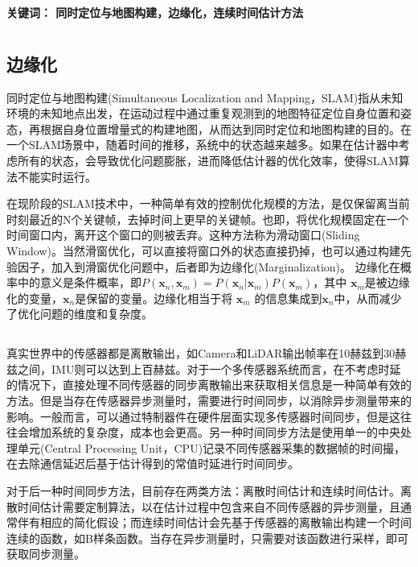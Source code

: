 \documentclass[12pt, onecolumn]{article}
\newcommand\normf{\fangsong}
\newcommand\keywords[1]{\bfseries{关键词：} \normf #1}
\begin{document}
	\noindent\keywords{同时定位与地图构建，边缘化，连续时间估计方法}
	
	\section{\normf{概述}}
	\normf\bfseries
	
	\subsection{\normf 边缘化}
	同时定位与地图构建(Simultaneous Localization and Mapping，SLAM)指从未知环境的未知地点出发，在运动过程中通过重复观测到的地图特征定位自身位置和姿态，再根据自身位置增量式的构建地图，从而达到同时定位和地图构建的目的\cite{高翔2017视觉}。在一个SLAM场景中，随着时间的推移，系统中的状态越来越多。如果在估计器中考虑所有的状态，会导致优化问题膨胀，进而降低估计器的优化效率，使得SLAM算法不能实时运行。
	
	在现阶段的SLAM技术中，一种简单有效的控制优化规模的方法，是仅保留离当前时刻最近的N个关键帧，去掉时间上更早的关键帧。也即，将优化规模固定在一个时间窗口内，离开这个窗口的则被丢弃。这种方法称为滑动窗口(Sliding Window)\cite{sibley2008sliding}。当然滑窗优化，可以直接将窗口外的状态直接扔掉，也可以通过构建先验因子，加入到滑窗优化问题中，后者即为边缘化(Marginalization)。
	边缘化在概率中的意义是条件概率，即$ P (\boldsymbol{x}_n, \boldsymbol{x}_m) = P (\boldsymbol{x}_n |\boldsymbol{x}_m)P (\boldsymbol{x}_m)$，其中 $\boldsymbol{x}_m$是被边缘化的变量，$\boldsymbol{x}_n$是保留的变量。边缘化相当于将 $\boldsymbol{x}_m$ 的信息集成到$\boldsymbol{x}_n$中，从而减少了优化问题的维度和复杂度。
	
	\subsection{\normf{离散时间和连续时间估计}}
	真实世界中的传感器都是离散输出，如Camera和LiDAR输出帧率在10赫兹到30赫兹之间，IMU则可以达到上百赫兹。对于一个多传感器系统而言，在不考虑时延的情况下，直接处理不同传感器的同步离散输出来获取相关信息是一种简单有效的方法。但是当存在传感器异步测量时，需要进行时间同步，以消除异步测量带来的影响。一般而言，可以通过特制器件在硬件层面实现多传感器时间同步，但是这往往会增加系统的复杂度，成本也会更高。另一种时间同步方法是使用单一的中央处理单元(Central Processing Unit，CPU)记录不同传感器采集的数据帧的时间撮，在去除通信延迟后基于估计得到的常值时延进行时间同步。
	
	对于后一种时间同步方法，目前存在两类方法：离散时间估计和连续时间估计。离散时间估计需要定制算法，以在估计过程中包含来自不同传感器的异步测量，且通常伴有相应的简化假设；而连续时间估计会先基于传感器的离散输出构建一个时间连续的函数，如B样条函数。当存在异步测量时，只需要对该函数进行采样，即可获取同步测量。
	
\end{document}
